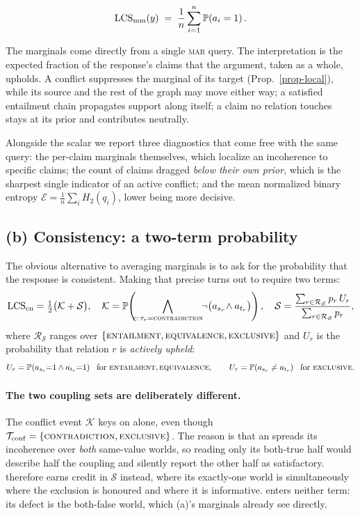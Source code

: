 \begin{equation}
\mathrm{LCS}_{\mathrm{mm}}(y) \;=\; \frac{1}{n}\sum_{i=1}^{n}\mathbb{P}\!\left( a_i=1 \right) .
\label{eq-mm}
\end{equation}

The marginals come directly from a single \textsc{mar} query. The interpretation is the expected
fraction of the response's claims that the argument, taken as a whole, upholds. A conflict
suppresses the marginal of its target (Prop.~\ref{prop-local}), while its source and the rest of the
graph may move either way; a satisfied entailment chain propagates support along itself; a claim no
relation touches stays at its prior and contributes neutrally.

Alongside the scalar we report three diagnostics that come free with the same query: the per-claim
marginals themselves, which localize an incoherence to specific claims; the count of claims dragged
\emph{below their own prior}, which is the sharpest single indicator of an active conflict; and the
mean normalized binary entropy $\mathcal{E}=\tfrac1n\sum_i H_2(q_i)$, lower being more decisive.

\subsection{(b) Consistency: a two-term probability}
\label{sec-consistency}

The obvious alternative to averaging marginals is to ask for the probability that the response is
consistent. Making that precise turns out to require two terms:
\begin{equation}
\mathrm{LCS}_{\mathrm{cn}} = \tfrac12\bigl(\mathcal{K}+\mathcal{S}\bigr),\quad
\mathcal{K} = \mathbb{P}\!\left( \!\!\bigwedge_{r:\,\tau_r=\textsc{contradiction}}\!\!\neg\bigl(a_{s_r}\!\wedge a_{t_r}\bigr) \right),\quad
\mathcal{S} = \frac{\sum_{r\in\mathcal{R}_{\mathcal{S}}} p_r\,U_r}
                   {\sum_{r\in\mathcal{R}_{\mathcal{S}}} p_r},
\label{eq-cons}
\end{equation}
where $\mathcal{R}_{\mathcal{S}}$ ranges over $\{\textsc{entailment},\textsc{equivalence},\textsc{exclusive}\}$ and $U_r$ is the probability that
relation $r$ is \emph{actively upheld}:
\[
U_r=\mathbb{P}\!\left( a_{s_r}{=}1 \wedge a_{t_r}{=}1 \right)\ \text{ for }\textsc{entailment},\textsc{equivalence},
\qquad
U_r=\mathbb{P}\!\left( a_{s_r}\neq a_{t_r} \right)\ \text{ for }\textsc{exclusive} .
\]

\paragraph{The two coupling sets are deliberately different.} The conflict event $\mathcal{K}$ keys
on \con{} alone, even though $\mathcal{T}_{\mathrm{conf}}=\{\textsc{contradiction},\textsc{exclusive}\}$. The reason is that an
\exc{} spreads its incoherence over \emph{both} same-value worlds, so reading only its both-true half
would describe half the coupling and silently report the other half as satisfactory. \exc{} therefore
earns credit in $\mathcal{S}$ instead, where its exactly-one world is simultaneously where the
exclusion is honoured and where it is informative. \cnc{} enters neither term: its defect is the
both-false world, which (a)'s marginals already see directly.

